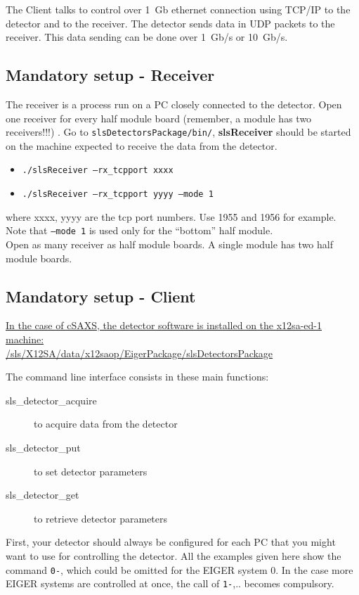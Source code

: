 \documentclass{article}
\begin{document}
The Client talks to control over 1~Gb ethernet connection using TCP/IP to the detector and to the receiver. The detector sends data in UDP packets to the receiver. This data sending can be done over 1~Gb/s or 10~Gb/s. 
 

\subsection{Mandatory setup - Receiver}

The receiver is a process run on a PC closely connected to the detector. Open one receiver for every half module board (remember, a module has two receivers!!!) . Go to {\tt{slsDetectorsPackage/bin/}}, \textbf{slsReceiver} should be started on the machine expected to receive the data from the detector.

\begin{itemize}
\item {\tt{./slsReceiver --rx\_tcpport xxxx}} 
\item {\tt{./slsReceiver --rx\_tcpport yyyy --mode 1}}
\end{itemize}

where xxxx, yyyy are the tcp port numbers. Use 1955 and 1956 for example. Note that {\tt{--mode 1}} is used only for the ``bottom'' half module. \\ Open as many receiver as half module boards. A single module has two half module boards.

\subsection{Mandatory setup - Client}

\underline{In the case of cSAXS, the detector software is installed on the x12sa-ed-1 machine:}\\
\underline{/sls/X12SA/data/x12saop/EigerPackage/slsDetectorsPackage}

The command line interface consists in these main functions:
\begin{description}
\item[sls\_detector\_acquire] to acquire data from the detector
\item[sls\_detector\_put] to set detector parameters
\item[sls\_detector\_get] to retrieve detector parameters
\end{description}


First, your detector should always be configured for each PC that you might want to use for controlling the detector. All the examples given here show the command {\tt{0-}}, which could be omitted for the EIGER system $0$. In the case more EIGER systems are controlled at once, the call of {\tt{1-}},.. becomes compulsory.
\end{document}
